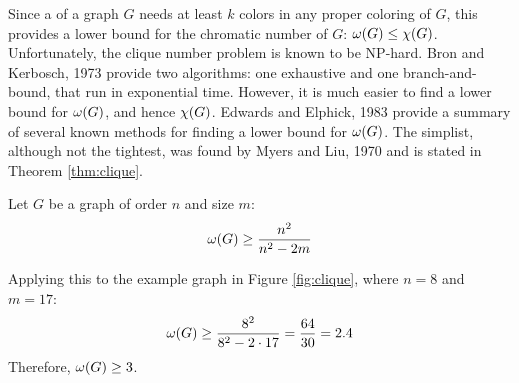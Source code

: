 Since a  of a graph \(G\) needs at least \(k\) colors in any proper coloring of \(G\), this provides a
lower bound for the chromatic number of \(G\): \(\omega(G)\le\chi(G)\).  Unfortunately, the clique number problem is
known to be NP-hard.  Bron and Kerbosch, 1973 \cite{bron} provide two algorithms: one exhaustive and one
branch-and-bound, that run in exponential time.  However, it is much easier to find a lower bound for \(\omega(G)\),
and hence \(\chi(G)\).  Edwards and Elphick, 1983 \cite{edwards} provide a summary of several known methods for
finding a lower bound for \(\omega(G)\).  The simplist, although not the tightest, was found by Myers and Liu, 1970
\cite{myers} and is stated in Theorem \ref{thm:clique}.

\begin{theorem}
  \label{thm:clique}
  Let \(G\) be a graph of order \(n\) and size \(m\):
  \[\omega(G)\ge\frac{n^2}{n^2-2m}\]
\end{theorem}

Applying this to the example graph in Figure \ref{fig:clique}, where \(n=8\) and \(m=17\):
\[\omega(G)\ge\frac{8^2}{8^2-2\cdot17}=\frac{64}{30}=2.4\]
Therefore, \(\omega(G)\ge3\).
